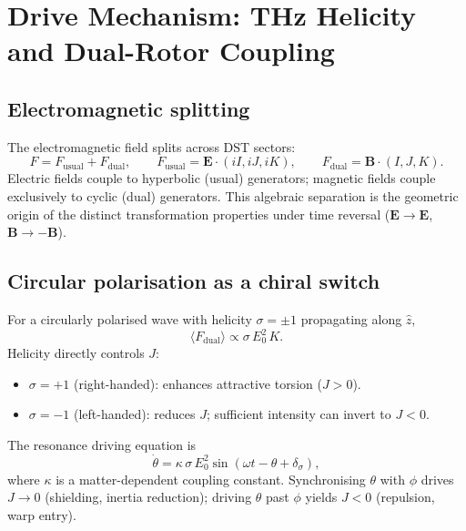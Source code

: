 \documentclass[dvipdfmx,a4paper]{article}
\theoremstyle{definition}
\begin{document}
\section{Drive Mechanism: THz Helicity and Dual-Rotor Coupling}
\label{sec:drive}

\subsection{Electromagnetic splitting}

The electromagnetic field splits across DST sectors:
\begin{equation}
F = F_{\mathrm{usual}} + F_{\mathrm{dual}},
\qquad
F_{\mathrm{usual}} = \mathbf{E}\cdot(iI,iJ,iK),
\qquad
F_{\mathrm{dual}} = \mathbf{B}\cdot(I,J,K).
\label{eq:F-split}
\end{equation}
Electric fields couple to hyperbolic (usual) generators; magnetic fields couple exclusively to cyclic (dual) generators. This algebraic separation is the geometric origin of the distinct transformation properties under time reversal ($\mathbf{E}\to\mathbf{E}$, $\mathbf{B}\to-\mathbf{B}$).

\subsection{Circular polarisation as a chiral switch}

For a circularly polarised wave with helicity $\sigma=\pm 1$ propagating along $\hat{z}$,
\begin{equation}
\langle F_{\mathrm{dual}}\rangle \propto \sigma\,E_0^2\,K.
\label{eq:Fdual-avg}
\end{equation}
Helicity directly controls $J$:
\begin{itemize}[leftmargin=2em]
  \item $\sigma=+1$ (right-handed): enhances attractive torsion ($J>0$).
  \item $\sigma=-1$ (left-handed): reduces $J$; sufficient intensity can invert to $J<0$.
\end{itemize}
The resonance driving equation is
\begin{equation}
\dot{\theta} = \kappa\,\sigma\,E_0^2\sin(\omega t - \theta + \delta_\sigma),
\label{eq:theta-dot}
\end{equation}
where $\kappa$ is a matter-dependent coupling constant. Synchronising $\theta$ with $\phi$ drives $J\to 0$ (shielding, inertia reduction); driving $\theta$ past $\phi$ yields $J<0$ (repulsion, warp entry).
\end{document}

